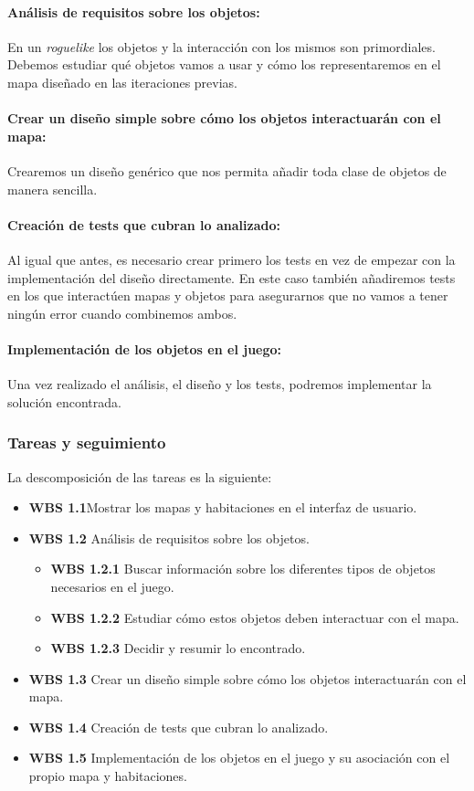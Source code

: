 \paragraph{Análisis de requisitos sobre los objetos:} En un \textit{roguelike} los objetos y la interacción con los mismos son primordiales. Debemos estudiar qué objetos vamos a usar y cómo los representaremos en el mapa diseñado en las iteraciones previas.

\paragraph{Crear un diseño simple sobre cómo los objetos interactuarán con el mapa:} Crearemos un diseño genérico que nos permita añadir toda clase de objetos de manera sencilla.

\paragraph{Creación de tests que cubran lo analizado:} Al igual que antes, es necesario crear primero los tests en vez de empezar con la implementación del diseño directamente. En este caso también añadiremos tests en los que interactúen mapas y objetos para asegurarnos que no vamos a tener ningún error cuando combinemos ambos.

\paragraph{Implementación de los objetos en el juego:} Una vez realizado el análisis, el diseño y los tests, podremos implementar la solución encontrada.

\subsubsection{Tareas y seguimiento}

La descomposición de las tareas es la siguiente:

\begin{itemize}
  \item \textbf{WBS 1.1}Mostrar los mapas y habitaciones en el interfaz de usuario.
  \item \textbf{WBS 1.2} Análisis de requisitos sobre los objetos.
    \begin{itemize}
      \item \textbf{WBS 1.2.1} Buscar información sobre los diferentes tipos de objetos necesarios en el juego.
      \item \textbf{WBS 1.2.2} Estudiar cómo estos objetos deben interactuar con el mapa.
      \item \textbf{WBS 1.2.3} Decidir y resumir lo encontrado.
    \end{itemize}
  \item \textbf{WBS 1.3} Crear un diseño simple sobre cómo los objetos interactuarán con el mapa.
  \item \textbf{WBS 1.4} Creación de tests que cubran lo analizado.
  \item \textbf{WBS 1.5} Implementación de los objetos en el juego y su asociación con el propio mapa y habitaciones.
\end{itemize}

